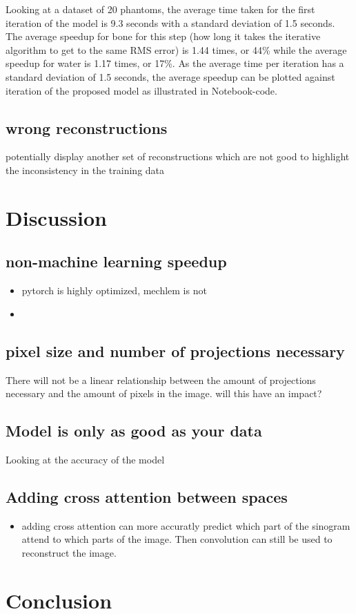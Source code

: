\documentclass{article}
\begin{document}
Looking at a dataset of 20 phantoms, the average time taken for the first iteration of the model is 9.3 seconds with a standard deviation of 1.5 seconds. The average speedup for bone for this step (how long it takes the iterative algorithm to get to the same RMS error) is 1.44 times, or 44\% while the average speedup for water is 1.17 times, or 17\%. As the average time per iteration has a standard deviation of 1.5 seconds, the average speedup can be plotted against iteration of the proposed model as illustrated in Notebook-code.

\subsection{wrong reconstructions}

potentially display another set of reconstructions which are not good to highlight the inconsistency in the training data

\section{Discussion}

\subsection{non-machine learning speedup}

\begin{itemize}
\item pytorch is highly optimized, mechlem is not
\item
\end{itemize}

\subsection{pixel size and number of projections necessary}

There will not be a linear relationship between the amount of projections necessary and the amount of pixels in the image. will this have an impact?

\subsection{Model is only as good as your data}

Looking at the accuracy of the model

\subsection{Adding cross attention between spaces}

\begin{itemize}
\item adding cross attention can more accuratly predict which part of the sinogram attend to which parts of the image. Then convolution can still be used to reconstruct the image.
\end{itemize}

\section{Conclusion}

\clearpage

\end{document}
